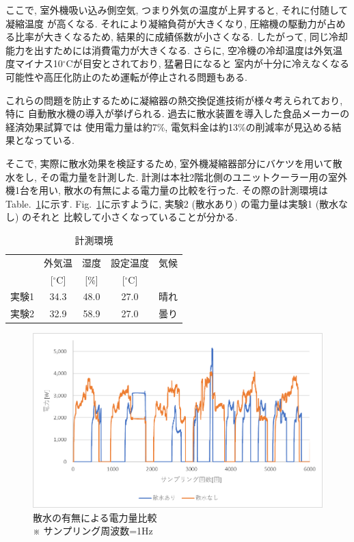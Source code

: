\documentclass[a4j,fleqn,dvipdfmx,uplatex]{jsarticle}
\newcommand{\figref}[1]{Fig.\ \ref{#1}}
\newcommand{\tableref}[1]{Table.\ \ref{#1}}
\begin{document}
ここで, 室外機吸い込み側空気, つまり外気の温度が上昇すると, それに付随して凝縮温度
が高くなる. それにより凝縮負荷が大きくなり, 圧縮機の駆動力が占める比率が大きくなるため, 
結果的に成績係数が小さくなる. したがって, 同じ冷却能力を出すためには消費電力が大きくなる.  
さらに, 空冷機の冷却温度は外気温度マイナス10$^\circ$Cが目安とされており, 猛暑日になると
室内が十分に冷えなくなる可能性や高圧化防止のため運転が停止される問題もある. 

これらの問題を防止するために凝縮器の熱交換促進技術が様々考えられており, 特に
自動散水機の導入が挙げられる. 過去に散水装置を導入した食品メーカーの経済効果試算では
使用電力量は約7\%, 電気料金は約13\%の削減率が見込める結果となっている\cite{thesis3}. 

そこで, 実際に散水効果を検証するため, 室外機凝縮器部分にバケツを用いて散水をし, 
その電力量を計測した. 計測は本社2階北側のユニットクーラー用の室外機1台を用い, 
散水の有無による電力量の比較を行った. その際の計測環境は\tableref{table:ex1}に示す. 
\figref{fig1:compare_watering}に示すように, 実験2 (散水あり) の電力量は実験1 (散水なし) のそれと
比較して小さくなっていることが分かる.

\begin{table}[htb]
  \caption{計測環境}
  \label{table:ex1}
  \centering
  \begin{tabular}{lcccc}
     & 外気温 & 湿度 & 設定温度 & 気候 \\[-1.5mm]
     & [$^\circ$C] & [\%] & [$^\circ$C] &  \\
    \hline \hline
    実験1 & 34.3 & 48.0 & 27.0 & 晴れ  \\
    実験2 & 32.9 & 58.9 & 27.0 & 曇り \\
    \hline
  \end{tabular}
\end{table}

\begin{figure}[htb]
  \centering
      \includegraphics[width=\linewidth]{img/ex1.png}
      \caption{散水の有無による電力量比較\\ \small ※ サンプリング周波数=1Hz}
      \label{fig1:compare_watering}
\end{figure}
\end{document}
